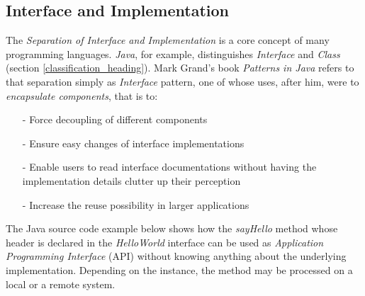 %
%
%
%
%
%
%

\subsection{Interface and Implementation}
\label{interface_and_implementation_heading}

The \emph{Separation of Interface and Implementation} is a core concept of many
programming languages. \emph{Java}, for example, distinguishes \emph{Interface}
and \emph{Class} (section \ref{classification_heading}). Mark Grand's book
\emph{Patterns in Java} \cite{grand} refers to that separation simply as
\emph{Interface} pattern, one of whose uses, after him, were to
\emph{encapsulate components}, that is to:

\begin{itemize}
    \item[-] Force decoupling of different components
    \item[-] Ensure easy changes of interface implementations
    \item[-] Enable users to read interface documentations without having the
        implementation details clutter up their perception
    \item[-] Increase the reuse possibility in larger applications
\end{itemize}

The Java source code example below shows how the \emph{sayHello} method whose
header is declared in the \emph{HelloWorld} interface can be used as
\emph{Application Programming Interface} (API) without knowing anything about
the underlying implementation. Depending on the instance, the method may be
processed on a local or a remote system.

